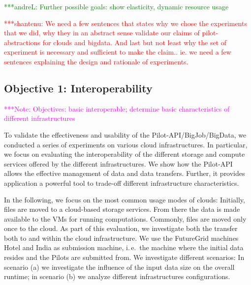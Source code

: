\documentclass[times]{cpeauth}
\newcommand{\jhanote}[1]{ {\textcolor{red} { ***shantenu: #1 }}}
\newcommand{\alnote}[1]{ {\textcolor{green} { ***andreL: #1 }}}
\newcommand{\note}[1]{ {\textcolor{magenta} { ***Note: #1 }}}
\newcommand{\alnote}[1]{}
\newcommand{\jhanote}[1]{}
\newcommand{\note}[1]{}
\newcommand{\pilot}{Pilot\xspace}
\newcommand{\pilots}{Pilots\xspace}
\begin{document}
\alnote{Further possible goals: show elasticity, dynamic resource usage}

\jhanote{We need a few sentences that states why we chose the
  experiments that we did, why they in an abstract sense validate our
  claims of pilot-abstractions for clouds and bigdata.  And last but
  not least why the set of experiment is necessary and sufficient to
  make the claim..  ie. we need a few sentences explaining the design
  and rationale of experiments.}
	
\subsection{Objective 1: Interoperability}
\label{sec:perf_interop}
\note{Objectives: basic interoperable; determine basic characteristics of 
different infrastructures}

To validate the effectiveness and usability of the Pilot-API/BigJob/BigData,
we conducted a series of experiments on various cloud infrastructures. In 
particular, we focus on evaluating the interoperability of the different 
storage and compute services offered by the different infrastructures.
We show how the \pilot-API allows the effective management of data and data 
transfers. Further, it provides application a powerful tool to trade-off 
different infrastructure characteristics. 

In the following, we focus on the most common usage modes of clouds: 
Initially, files are moved to a cloud-based storage services. From there the 
data is made available to the VMs for running computations. Commonly, files 
are moved only once to the cloud. As part of this evaluation, we investigate 
both the transfer both to and within the cloud infrastructure. We use the 
FutureGrid machines Hotel and India as submission machine, i.\,e.\ the machine 
where the initial data resides and the \pilots are submitted from. We 
investigate different scenarios: In scenario (a) we investigate the influence
of the input data size on the overall runtime; in scenario (b) we analyze
different infrastructures configurations.
\end{document}
